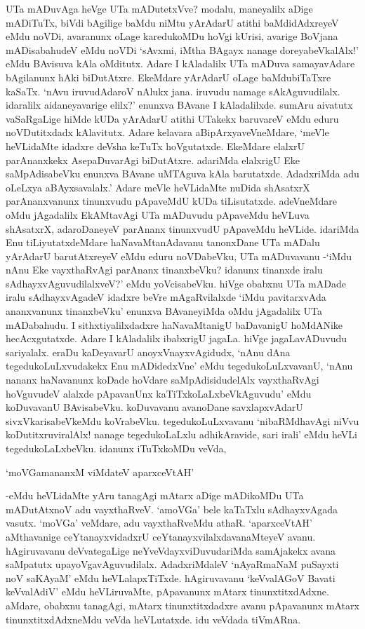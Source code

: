 UTa mADuvAga heVge UTa mADutetxVve? modalu, maneyalilx aDige mADiTuTx, biVdi bAgilige baMdu niMtu yArAdarU atithi baMdidAdxreyeV eMdu noVDi, avaranunx oLage karedukoMDu hoVgi kUrisi, avarige BoVjana mADisabahudeV eMdu noVDi `sAvxmi, iMtha BAgayx nanage doreyabeVkalAlx!' eMdu BAvisuva kAla oMditutx. Adare I kAladalilx UTa mADuva samayavAdare bAgilanunx hAki biDutAtxre. EkeMdare yArAdarU oLage baMdubiTaTxre kaSaTx. `nAvu iruvudAdaroV nAlukx jana. iruvudu namage sAkAguvudilalx. idaralilx aidaneyavarige elilx?' enunxva BAvane I kAladalilxde. sumAru aivatutx vaSaRgaLige hiMde kUDa yArAdarU atithi UTakekx baruvareV eMdu eduru noVDutitxdadx kAlavitutx. Adare kelavara aBipArxyaveVneMdare, `meVle heVLidaMte idadxre deVsha keTuTx hoVgutatxde. EkeMdare elalxrU parAnanxkekx AsepaDuvarAgi biDutAtxre. adariMda elalxrigU Eke saMpAdisabeVku enunxva BAvane uMTAguva kAla barutatxde. AdadxriMda adu oLeLxya aBAyxsavalalx.' Adare meVle heVLidaMte nuDida shAsatxrX parAnanxvanunx tinunxvudu pApaveMdU kUDa tiLisutatxde. adeVneMdare oMdu jAgadalilx EkAMtavAgi UTa mADuvudu pApaveMdu heVLuva shAsatxrX, adaroDaneyeV parAnanx tinunxvudU pApaveMdu heVLide. idariMda Enu tiLiyutatxdeMdare haNavaMtanAdavanu tanonxDane UTa mADalu yArAdarU barutAtxreyeV eMdu eduru noVDabeVku, UTa mADuvavanu -`iMdu nAnu Eke vayxthaRvAgi parAnanx tinanxbeVku? idanunx tinanxde iralu sAdhayxvAguvudilalxveV?' eMdu yoVcisabeVku. hiVge obabxnu UTa mADade iralu sAdhayxvAgadeV idadxre beVre mAgaRvilalxde `iMdu pavitarxvAda ananxvanunx tinanxbeVku' enunxva BAvaneyiMda oMdu jAgadalilx UTa mADabahudu. I sithxtiyalilxdadxre haNavaMtanigU baDavanigU hoMdANike hecAcxgutatxde. Adare I kAladalilx ibabxrigU jagaLa. hiVge jagaLavADuvudu sariyalalx. eraDu kaDeyavarU anoyxVnayxvAgidudx, `nAnu dAna tegedukoLuLxvudakekx Enu mADidedxVne' eMdu tegedukoLuLxvavanU, `nAnu nananx haNavanunx koDade hoVdare saMpAdisidudelAlx vayxthaRvAgi hoVguvudeV alalxde pApavanUnx kaTiTxkoLaLxbeVkAguvudu' eMdu koDuvavanU BAvisabeVku. koDuvavanu avanoDane savxlapxvAdarU sivxVkarisabeVkeMdu koVrabeVku. tegedukoLuLxvavanu `nibaRMdhavAgi niVvu koDutitxruviralAlx! nanage tegedukoLaLxlu adhikAravide, sari irali' eMdu heVLi tegedukoLaLxbeVku. idanunx iTuTxkoMDu veVda,

\begin{shloka}
`moVGamananxM viMdateV aparxceVtAH'
\end{shloka}

-eMdu heVLidaMte yAru tanagAgi mAtarx aDige mADikoMDu UTa mADutAtxnoV adu vayxthaRveV. `amoVGa' bele kaTaTxlu sAdhayxvAgada vasutx. `moVGa' veMdare, adu vayxthaRveMdu athaR. `aparxceVtAH' aMthavanige ceYtanayxvidadxrU ceYtanayxvilalxdavanaMteyeV avanu. hAgiruvavanu deVvategaLige neYveVdayxviDuvudariMda samAjakekx avana saMpatutx upayoVgavAguvudilalx. AdadxriMdaleV `nAyaRmaNaM puSayxti noV saKAyaM' eMdu heVLalapxTiTxde. hAgiruvavanu `keVvalAGoV Bavati keVvalAdiV' eMdu heVLiruvaMte, pApavanunx mAtarx tinunxtitxdAdxne. aMdare, obabxnu tanagAgi, mAtarx tinunxtitxdadxre avanu pApavanunx mAtarx tinunxtitxdAdxneMdu veVda heVLutatxde. idu veVdada tiVmARna.

